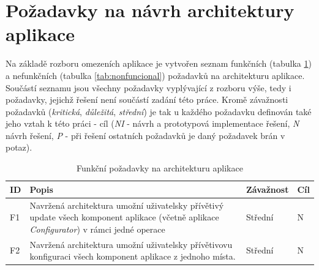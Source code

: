 \section{Požadavky na návrh architektury aplikace}
\label{sec:ana_requiremets}
Na základě rozboru omezeních aplikace je vytvořen seznam funkčních (tabulka \ref{tab:funcional}) a nefunkčních (tabulka \ref{tab:nonfuncional}) požadavků na architekturu aplikace. Součástí seznamu jsou všechny požadavky vyplývající z rozboru výše, tedy i požadavky, jejichž řešení není součástí zadání této práce. Kromě závažnosti požadavků (\textit{kritická}, \textit{důležitá}, \textit{střední}) je tak u každého požadavku definován také jeho vztah k této práci - cíl (\textit{NI} - návrh a prototypová implementace řešení, \textit{N} návrh řešení, \textit{P} - při řešení ostatních požadavků je daný požadavek brán v potaz).

\begin{table}[h!]
\begin{center}
\centering
\caption{Funkční požadavky na architekturu aplikace}
\label{tab:funcional}
\begin{tabular}{|p{1cm}|p{9cm}|p{2cm}|p{1cm}|}
	\hline
    ID & Popis & Závažnost & Cíl \\ \hline

	 F1 & Navržená architektura umožní uživatelsky přívětivý update všech komponent aplikace (včetně aplikace \textit{Configurator}) v rámci jedné operace & Střední & N \\ \hline

	 F2 & Navržená architektura umožní uživatelsky přívětivovu konfiguraci všech komponent aplikace z jednoho místa. & Střední & N \\ \hline
 \end{tabular}
 \end{center}
 \end{table}

